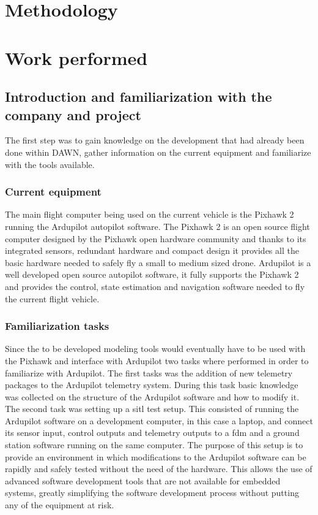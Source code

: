 \section{Methodology}

\section{Work performed}
\subsection{Introduction and familiarization with the company and project}
The first step was to gain knowledge on the development that had already been done within DAWN, gather information on the current equipment and familiarize with the tools available.

\subsubsection{Current equipment}
The main flight computer being used on the current vehicle is the Pixhawk 2 running the Ardupilot autopilot software. The Pixhawk 2 is an open source flight computer designed by the Pixhawk open hardware community and thanks to its integrated sensors, redundant hardware and compact design it provides all the basic hardware needed to safely fly a small to medium sized drone. Ardupilot is a well developed open source autopilot software, it fully supports the Pixhawk 2 and provides the control, state estimation and navigation software needed to fly the current flight vehicle.

\subsubsection{Familiarization tasks}
Since the to be developed modeling tools would eventually have to be used with the Pixhawk and interface with Ardupilot two tasks where performed in order to familiarize with Ardupilot. The first tasks was the addition of new telemetry packages to the Ardupilot telemetry system. During this task basic knowledge was collected on the structure of the Ardupilot software and how to modify it. \\

The second task was setting up a \gls{sitl} test setup. This consisted of running the Ardupilot software on a development computer, in this case a laptop, and connect its sensor input, control outputs and telemetry outputs to a \gls{fdm} and a ground station software running on the same computer. The purpose of this setup is to provide an environment in which modifications to the Ardupilot software can be rapidly and safely tested without the need of the hardware. This allows the use of advanced software development tools that are not available for embedded systems, greatly simplifying the software development process without putting any of the equipment at risk. \\

